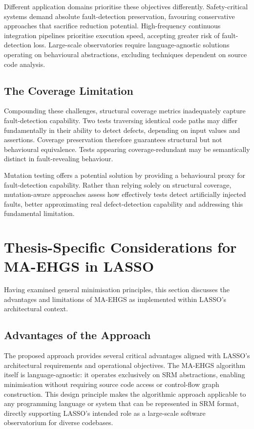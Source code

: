 Different application domains prioritise these objectives differently. Safety-critical systems demand absolute fault-detection preservation, favouring conservative approaches that sacrifice reduction potential. High-frequency continuous integration pipelines prioritise execution speed, accepting greater risk of fault-detection loss. Large-scale observatories require language-agnostic solutions operating on behavioural abstractions, excluding techniques dependent on source code analysis.

\subsection{The Coverage Limitation}

Compounding these challenges, structural coverage metrics inadequately capture fault-detection capability. Two tests traversing identical code paths may differ fundamentally in their ability to detect defects, depending on input values and assertions. Coverage preservation therefore guarantees structural but not behavioural equivalence. Tests appearing coverage-redundant may be semantically distinct in fault-revealing behaviour.

Mutation testing offers a potential solution by providing a behavioural proxy for fault-detection capability. Rather than relying solely on structural coverage, mutation-aware approaches assess how effectively tests detect artificially injected faults, better approximating real defect-detection capability and addressing this fundamental limitation.







\section{Thesis-Specific Considerations for MA-EHGS in LASSO}
\label{sec:discussion:specific}

Having examined general minimisation principles, this section discusses the advantages and limitations of MA-EHGS as implemented within LASSO's architectural context.

\subsection{Advantages of the Approach}

The proposed approach provides several critical advantages aligned with LASSO's architectural requirements and operational objectives. The MA-EHGS algorithm itself is language-agnostic: it operates exclusively on SRM abstractions, enabling minimisation without requiring source code access or control-flow graph construction. This design principle makes the algorithmic approach applicable to any programming language or system that can be represented in SRM format, directly supporting LASSO's intended role as a large-scale software observatorium for diverse codebases.

